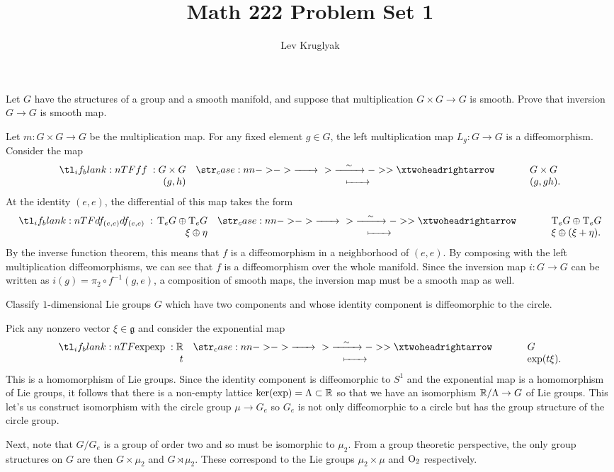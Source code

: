 \documentclass{lkx_pset}
\title{Math 222 Problem Set 1}
\author{Lev Kruglyak}
\begin{document}
\maketitle

\begin{problem}{2}
  Let $G$ have the structures of a group and a smooth manifold, and suppose that multiplication $G\times G\to G$ is smooth. Prove that inversion $G\to G$ is smooth map.
\end{problem}

\begin{solution}
  Let $m : G\times G \to G$ be the multiplication map. For any fixed element $g\in G$, the left multiplication map $L_g : G\to G$ is a diffeomorphism. Consider the map 
  \[
    \lkxfunc{f}{G\times G}{G\times G}{(g,h)}{(g,gh).}
  \]
  At the identity $(e,e)$, the differential of this map takes the form
  \[
    \lkxfunc{df_{(e,e)}}{\T_e G\oplus \T_e G}{\T_e G\oplus \T_{e} G}{\xi\oplus \eta}{\xi\oplus (\xi+\eta).}
  \]
  By the inverse function theorem, this means that $f$ is a diffeomorphism in a neighborhood of $(e,e)$. By composing with the left multiplication diffeomorphisms, we can see that $f$ is a diffeomorphism over the whole manifold. Since the inversion map $i : G\to G$ can be written as $i(g) = \pi_2 \circ f^{-1}(g,e)$, a composition of smooth maps, the inversion map must be a smooth map as well.
\end{solution}

\begin{problem}{4}
  Classify $1$-dimensional Lie groups $G$ which have two components and whose identity component is diffeomorphic to the circle.
\end{problem}

\begin{solution}
  Pick any nonzero vector $\xi\in \mathfrak{g}$ and consider the exponential map
  \[
    \lkxfunc{\exp}{\R}{G}{t}{\exp(t\xi).}
  \]
  This is a homomorphism of Lie groups. Since the identity component is diffeomorphic to $S^1$ and the exponential map is a homomorphism of Lie groups, it follows that there is a non-empty lattice $\ker(\exp) = \Lambda \subset \mathbb{R}$ so that we have an isomorphism $\mathbb{R}/\Lambda \to G$ of Lie groups. This let's us construct isomorphism with the circle group $\mu \to G_e$ so $G_e$ is not only diffeomorphic to a circle but has the group structure of the circle group. 

  Next, note that $G/G_e$ is a group of order two and so must be isomorphic to $\mu_2$. From a group theoretic perspective, the only group structures on $G$ are then $G\times \mu_2$ and $G\rtimes \mu_2$. These correspond to the Lie groups $\mu_2\times \mu$ and ${\operatorname{O}}_2$ respectively.
\end{solution}
\end{document}
